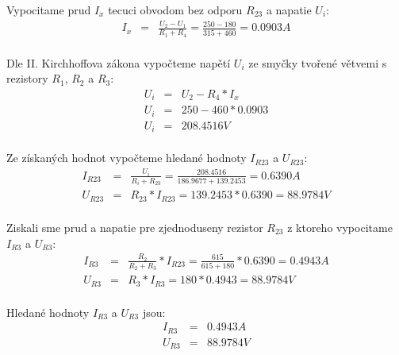 \documentclass[a4paper,oneside,12pt]{article}
\begin{document}
	Vypocitame prud $I_{x}$ tecuci obvodom bez odporu $R_{23}$ a napatie $U_{i}$:
	\begin{eqnarray*}
		I_{x} &= & \frac{U_{2} - U_{1}}{R_{1} + R_{4}} = \frac{250 - 180}{315 + 460} = 0.0903 A\\
	\end{eqnarray*}

	Dle II. Kirchhoffova zákona vypočteme napětí $U_{i}$ ze smyčky tvořené větvemi s rezistory $R_{1}$, $R_{2}$ a $R_{3}$:
	\begin{eqnarray*}
		U_{i} &= & U_{2} - R_{4} * I_{x} \\
		U_{i} &= & 250 - 460 * 0.0903 \\
		U_{i} &= & 208.4516V \\
	\end{eqnarray*}

	Ze získaných hodnot vypočteme hledané hodnoty $I_{R23}$ a $U_{R23}$:
	\begin{eqnarray*}
		I_{R23} &= & \frac{U_{i}}{R_{i} + R_{23}} = \frac{208.4516}{186.9677 + 139.2453} = 0.6390 A\\
		U_{R23} &= & R_{23} * I_{R23} = 139.2453 * 0.6390 = 88.9784 V\\
	\end{eqnarray*}

	Ziskali sme prud a napatie pre zjednoduseny rezistor $R_{23}$ z ktoreho vypocitame $I_{R3}$ a $U_{R3}$:
	\begin{eqnarray*}
		I_{R3} &= & \frac{R_{2}}{R_{2} + R_{3}} * I_{R23} = \frac{615}{615 + 180} * 0.6390 = 0.4943 A\\
		U_{R3} &= & R_{3} * I_{R3} = 180 * 0.4943 = 88.9784 V\\
	\end{eqnarray*}

	Hledané hodnoty $I_{R3}$ a $U_{R3}$ jsou:
	\begin{eqnarray*}
		I_{R3} &= & 0.4943 A\\
		U_{R3} &= & 88.9784 V\\
	\end{eqnarray*}

	\newpage
\end{document}
